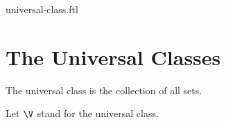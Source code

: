 \documentclass{naproche-library}
\begin{document}
\begin{smodule}{universal-class.ftl}


  \section*{The Universal Classes}

  \begin{definition}[forthel,id=FOUNDATIONS_10_9625487120366325,printid]
    The universal class is the collection of all sets.

    Let $\V$ stand for the universal class.
  \end{definition}
\end{smodule}
\end{document}
